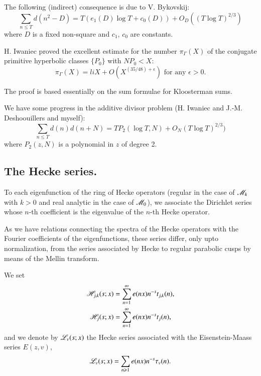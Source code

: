 The following (indirect) consequence is due to V. Bykovskij:
\begin{equation}
\sum\limits_{n \leqslant T} d (n^2 -D) = T (e_1 (D) \log T + c_0 (D)) + O_D ((T \log T)^{2/3}) \label{art7-eq1.43}
\end{equation}
where $D$ is a fixed non-square and $c_1$, $c_0$ are constants.

H. Iwaniec proved the excellent estimate for the number $\pi_\Gamma (X)$ of the conjugate primitive hyperbolic classes $\{P_0\}$ with $NP_0 < X$:
\begin{equation}
\pi_\Gamma (X) = liX + O(X^{(35/48) +\epsilon}) \text{ for any } \epsilon > 0. \label{art7-eq1.44}
\end{equation}

The proof is based essentially on the sum formulae for Kloosterman sums. 

We have some progress in the additive divisor problem (H. Iwaniec and J.-M. Deshoouillers and myself):
\begin{equation}
\sum\limits_{n \leqslant T}  d(n) d (n+N) = T P_2 (\log T, N) + O_N(T \log T)^{2/3}) \label{art7-eq1.45}
\end{equation}
where $P_2 (z, N)$ is a polynomial in $z$ of degree 2. 

\subsection{The Hecke series.}\label{art7-subsec1.8}

To each eigenfunction of the ring of Hecke operators (regular in the case of $\mathscr{M}_k$\pageoriginale with $k >0$ and real analytic in the case of $\mathscr{M}_0$), we associate the Dirichlet series whose $n$-th coefficient is the eigenvalue of the $n$-th Hecke operator.

As we have relations connecting the spectra of the Hecke operators with the Fourier coefficients of the eigenfunctions, these series differ, only upto normalization, from the series associated by Hecke to regular parabolic cusps by means of the Mellin transform. 

We set 
\begin{align}
\mathscr{H}_{j,k} (s;x) & = \sum\limits^\infty_{n =1} e(nx) n^{-s} t_{j,k} (n), \label{art7-eq1.46}\\
\mathscr{H}_{j} (s;x) & = \sum\limits^\infty_{n=1} e(nx) n^{-s} t_j(n), \notag
\end{align}
and we denote by $\mathscr{L}_v(s;x)$ the Hecke series associated with the Eisenstein-Maass series $E(z,v)$,
\begin{equation}
\mathscr{L}_v (s;x) = \sum\limits_{n \geqslant 1} e (nx) n^{-s} \tau_v (n). \label{art7-eq1.47}
\end{equation}

